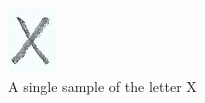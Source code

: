 \documentclass[11pt]{IEEEtran}
\begin{document}
\begin{figure}[h]
     \centering
     \begin{subfigure}[b]{0.15\textwidth}
         \centering
         \includegraphics[width=\textwidth]{tem1}
         \caption{A single sample of the letter X}
         \label{fig:tem1}
     \end{subfigure}
     \hfill
     \begin{subfigure}[b]{0.15\textwidth}
         \centering

\end{subfigure}
\end{figure}
\end{document}
